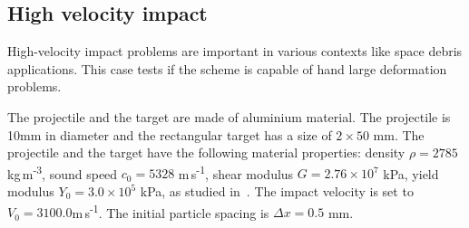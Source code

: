 \documentclass[preprint,12pt]{elsarticle}
\begin{document}
\FloatBarrier%
\subsection{High velocity impact}

High-velocity impact problems are important in various contexts like space
debris applications. This case tests if the scheme is capable of hand large
deformation problems.

The projectile and the target are made of aluminium material. The projectile
is 10mm in diameter and the rectangular target has a size of $2 \times 50$ mm.
The projectile and the target have the following material properties: density
$\rho = 2785 $ kg\,m\textsuperscript{-3}, sound speed $c_0 = 5328$
 m\,s\textsuperscript{-1}, shear modulus $G=2.76 \times 10^{7}$ kPa, yield modulus
$Y_0 = 3.0 \times 10^{5}$ kPa, as studied in~\cite{zhang_hu_adams17}. The impact velocity is set to
$V_0 = 3100.0$m\,s\textsuperscript{-1}. The initial particle spacing is
$\Delta x = 0.5$ mm.
\end{document}

